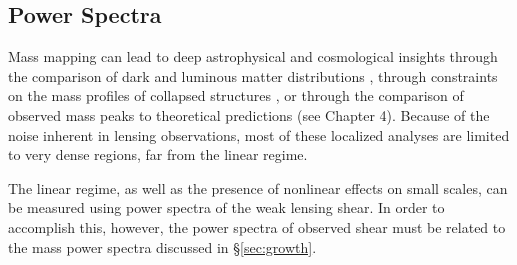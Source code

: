 \subsection{Power Spectra}
Mass mapping can lead to deep astrophysical and cosmological insights through
the comparison of dark and luminous matter distributions
\citep[e.g.][]{Clowe06}, through constraints on the mass profiles of
collapsed structures \citep[e.g.][]{Oguri2012}, or
through the comparison of observed mass peaks to
theoretical predictions (see Chapter 4).  Because of the noise inherent in
lensing observations, most of these localized analyses are limited to
very dense regions, far from the linear regime.

The linear regime, as well as the presence of nonlinear effects on small
scales, can be measured using power spectra of the weak lensing shear.  In
order to accomplish this, however, the power spectra of observed shear must
be related to the mass power spectra discussed in \S\ref{sec:growth}.


